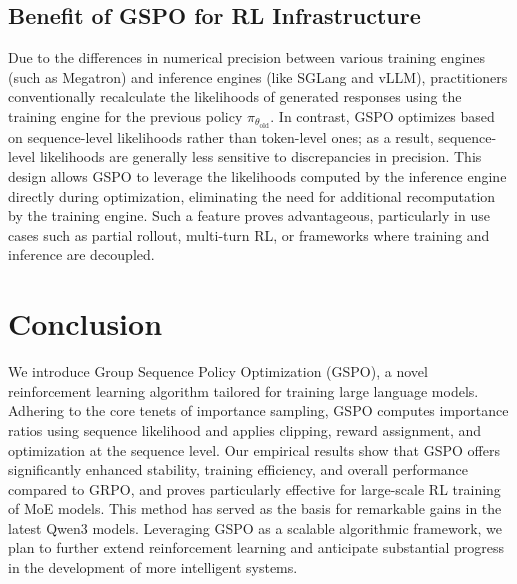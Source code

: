\subsection{Benefit of GSPO for RL Infrastructure}

Due to the differences in numerical precision between various training engines (such as Megatron) and inference engines (like SGLang and vLLM), practitioners conventionally recalculate the likelihoods of generated responses using the training engine for the previous policy $\pi_{\theta_\text{old}}$. In contrast, GSPO optimizes based on sequence-level likelihoods rather than token-level ones; as a result, sequence-level likelihoods are generally less sensitive to discrepancies in precision. This design allows GSPO to leverage the likelihoods computed by the inference engine directly during optimization, eliminating the need for additional recomputation by the training engine. Such a feature proves advantageous, particularly in use cases such as partial rollout, multi-turn RL, or frameworks where training and inference are decoupled.

\section{Conclusion}

We introduce Group Sequence Policy Optimization (GSPO), a novel reinforcement learning algorithm tailored for training large language models. Adhering to the core tenets of importance sampling, GSPO computes importance ratios using sequence likelihood and applies clipping, reward assignment, and optimization at the sequence level. Our empirical results show that GSPO offers significantly enhanced stability, training efficiency, and overall performance compared to GRPO, and proves particularly effective for large-scale RL training of MoE models. This method has served as the basis for remarkable gains in the latest Qwen3 models. Leveraging GSPO as a scalable algorithmic framework, we plan to further extend reinforcement learning and anticipate substantial progress in the development of more intelligent systems.

